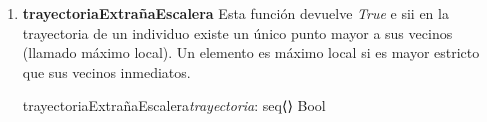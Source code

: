 \documentclass[10pt,a4paper]{article}
\begin{document}
\begin{enumerate}
    \clearpage 

    \item \textbf{trayectoriaExtrañaEscalera} Esta función devuelve \textit{True} e sii en la trayectoria de un individuo existe un único punto mayor a sus vecinos (llamado máximo local). Un elemento es máximo local si es mayor estricto que sus vecinos inmediatos.
    
    \begin{proc}{trayectoriaExtrañaEscalera}{\In \textit{trayectoria}: seq⟨\real⟩} {Bool}


    \end{proc}

\end{enumerate}
\end{document}
